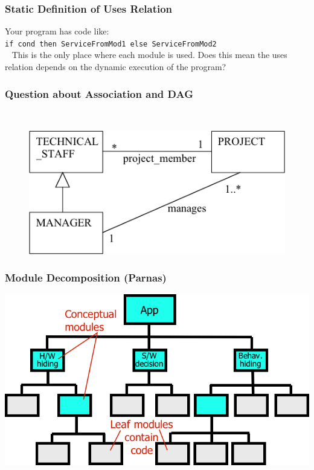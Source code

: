 \documentclass[t,12pt,numbers,fleqn]{beamer}
\begin{document}

\begin{frame}
\frametitle{Static Definition of Uses Relation}

Your program has code like:\\
\texttt{if cond then ServiceFromMod1 else ServiceFromMod2}\\
~\newline
This is the only place where each module is used.  Does this mean the uses
relation depends on the dynamic execution of the program?
\end{frame}


\begin{frame}
\frametitle{Question about Association and DAG}

\\

\begin{figure}
\includegraphics[scale=0.6]{../Figures/UML_Association.png}
\end{figure}

\end{frame}


\begin{frame}
\frametitle{Module Decomposition (Parnas)}

\begin{center}
\includegraphics[width=1.0\textwidth]{../Figures/ParnasDecompBySecrets.png}
\end{center}

\end{frame}
\end{document}
